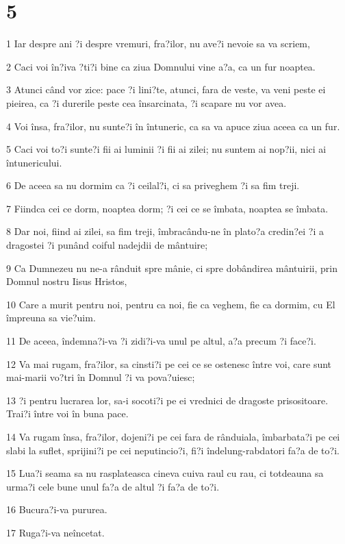 \chapter{5}

\par 1 Iar despre ani ?i despre vremuri, fra?ilor, nu ave?i nevoie sa va scriem,
\par 2 Caci voi în?iva ?ti?i bine ca ziua Domnului vine a?a, ca un fur noaptea.
\par 3 Atunci când vor zice: pace ?i lini?te, atunci, fara de veste, va veni peste ei pieirea, ca ?i durerile peste cea însarcinata, ?i scapare nu vor avea.
\par 4 Voi însa, fra?ilor, nu sunte?i în întuneric, ca sa va apuce ziua aceea ca un fur.
\par 5 Caci voi to?i sunte?i fii ai luminii ?i fii ai zilei; nu suntem ai nop?ii, nici ai întunericului.
\par 6 De aceea sa nu dormim ca ?i ceilal?i, ci sa priveghem ?i sa fim treji.
\par 7 Fiindca cei ce dorm, noaptea dorm; ?i cei ce se îmbata, noaptea se îmbata.
\par 8 Dar noi, fiind ai zilei, sa fim treji, îmbracându-ne în plato?a credin?ei ?i a dragostei ?i punând coiful nadejdii de mântuire;
\par 9 Ca Dumnezeu nu ne-a rânduit spre mânie, ci spre dobândirea mântuirii, prin Domnul nostru Iisus Hristos,
\par 10 Care a murit pentru noi, pentru ca noi, fie ca veghem, fie ca dormim, cu El împreuna sa vie?uim.
\par 11 De aceea, îndemna?i-va ?i zidi?i-va unul pe altul, a?a precum ?i face?i.
\par 12 Va mai rugam, fra?ilor, sa cinsti?i pe cei ce se ostenesc între voi, care sunt mai-marii vo?tri în Domnul ?i va pova?uiesc;
\par 13 ?i pentru lucrarea lor, sa-i socoti?i pe ei vrednici de dragoste prisositoare. Trai?i între voi în buna pace.
\par 14 Va rugam însa, fra?ilor, dojeni?i pe cei fara de rânduiala, îmbarbata?i pe cei slabi la suflet, sprijini?i pe cei neputincio?i, fi?i îndelung-rabdatori fa?a de to?i.
\par 15 Lua?i seama sa nu rasplateasca cineva cuiva raul cu rau, ci totdeauna sa urma?i cele bune unul fa?a de altul ?i fa?a de to?i.
\par 16 Bucura?i-va pururea.
\par 17 Ruga?i-va neîncetat.
